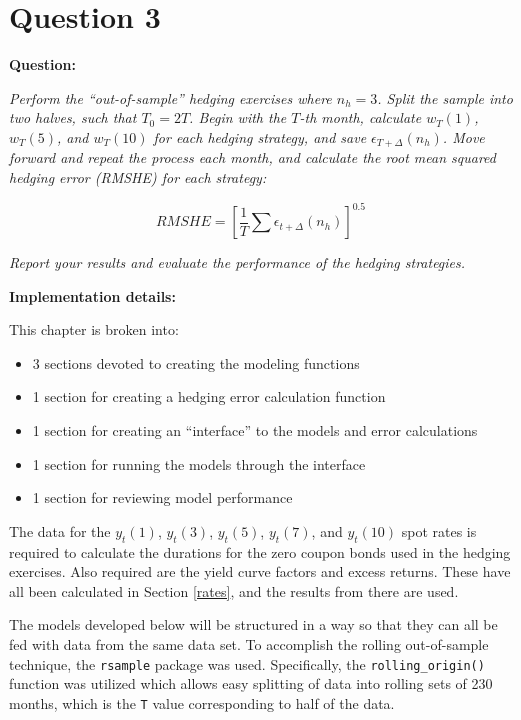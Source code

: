 \documentclass[openany]{book}
\providecommand{\tightlist}{%
  \setlength{\itemsep}{0pt}\setlength{\parskip}{0pt}}
\theoremstyle{definition}
\theoremstyle{definition}
\theoremstyle{definition}
\theoremstyle{remark}
\begin{document}
\normalsize

\hypertarget{q3}{%
\chapter{Question 3}\label{q3}}

\textbf{Question:}

\emph{Perform the ``out-of-sample'' hedging exercises where \(n_h = 3\).
Split the sample into two halves, such that \(T_0 = 2T\). Begin with the
\(T\)-th month, calculate \(w_T(1)\), \(w_T(5)\), and \(w_T(10)\) for
each hedging strategy, and save \(\epsilon_{T+\Delta}(n_h)\). Move
forward and repeat the process each month, and calculate the root mean
squared hedging error (RMSHE) for each strategy:}

\[ RMSHE = [\frac{1}{T} \sum{\epsilon_{t+\Delta}(n_h)}]^{0.5} \]

\emph{Report your results and evaluate the performance of the hedging
strategies.}

\textbf{Implementation details:}

This chapter is broken into:

\begin{itemize}
\tightlist
\item
  3 sections devoted to creating the modeling functions
\item
  1 section for creating a hedging error calculation function
\item
  1 section for creating an ``interface'' to the models and error
  calculations
\item
  1 section for running the models through the interface
\item
  1 section for reviewing model performance
\end{itemize}

\small

\normalsize

The data for the \(y_t(1)\), \(y_t(3)\), \(y_t(5)\), \(y_t(7)\), and
\(y_t(10)\) spot rates is required to calculate the durations for the
zero coupon bonds used in the hedging exercises. Also required are the
yield curve factors and excess returns. These have all been calculated
in Section \ref{rates}, and the results from there are used.

\small

\normalsize

The models developed below will be structured in a way so that they can
all be fed with data from the same data set. To accomplish the rolling
out-of-sample technique, the \texttt{rsample} package was used.
Specifically, the \texttt{rolling\_origin()} function was utilized which
allows easy splitting of data into rolling sets of 230 months, which is
the \texttt{T} value corresponding to half of the data.
\end{document}
